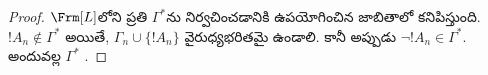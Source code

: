 \documentclass[../../../include/open-logic-section]{subfiles}
\begin{document}
\begin{proof}
$\Frm[L]$లోని ప్రతి  $\Gamma^*$ను నిర్వచించడానికి
ఉపయోగించిన జాబితాలో కనిపిస్తుంది. $!A_n \notin \Gamma^*$ అయితే,
$\Gamma_n \cup \{!A_n\}$ వైరుధ్యభరితమై ఉండాలి. కానీ
అప్పుడు $\lnot !A_n \in \Gamma^*$. అందువల్ల $\Gamma^*$
.
\end{proof}
\end{document}
